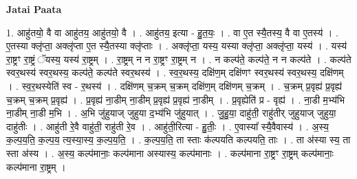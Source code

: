 \documentclass[17pt]{extarticle}
\begin{document}
\textbf{Jatai Paata} \newline

1. आहु॑तयो॒ वै वा आहु॑तय॒ आहु॑तयो॒ वै । . आहु॑तय॒ इत्या - हु॒त॒यः॒ । . वा ए॒त स्यै॒तस्य॒ वै वा ए॒तस्य॑ । . ए॒तस्या क्लृ॑प्ता॒ अक्लृ॑प्ता ए॒त स्यै॒तस्या क्लृ॑प्ताः । . अक्लृ॑प्ता॒ यस्य॒ यस्या क्लृ॑प्ता॒ अक्लृ॑प्ता॒ यस्य॑ । . यस्य॑ रा॒ष्ट्रꣳ रा॒ष्ट्रं ॅयस्य॒ यस्य॑ रा॒ष्ट्रम् । . रा॒ष्ट्रम् न न रा॒ष्ट्रꣳ रा॒ष्ट्रम् न । . न कल्प॑ते॒ कल्प॑ते॒ न न कल्प॑ते । . कल्प॑ते स्वर॒थस्य॑ स्वर॒थस्य॒ कल्प॑ते॒ कल्प॑ते स्वर॒थस्य॑ । . स्व॒र॒थस्य॒ दक्षि॑ण॒म् दक्षि॑णꣳ स्वर॒थस्य॑ स्वर॒थस्य॒ दक्षि॑णम् । . स्व॒र॒थस्येति॑ स्व - र॒थस्य॑ । . दक्षि॑णम् च॒क्रम् च॒क्रम् दक्षि॑ण॒म् दक्षि॑णम् च॒क्रम् । . च॒क्रम् प्र॒वृह्य॑ प्र॒वृह्य॑ च॒क्रम् च॒क्रम् प्र॒वृह्य॑ । . प्र॒वृह्य॑ ना॒डीम् ना॒डीम् प्र॒वृह्य॑ प्र॒वृह्य॑ ना॒डीम् । . प्र॒वृह्येति॑ प्र - वृह्य॑ । . ना॒डी म॒भ्य॑भि ना॒डीम् ना॒डी म॒भि । . अ॒भि जु॑हुयाज् जुहुया द॒भ्य॑भि जु॑हुयात् । . जु॒हु॒या॒ दाहु॑ती॒ राहु॑तीर् जुहुयाज् जुहुया॒ दाहु॑तीः । . आहु॑ती रे॒वै वाहु॑ती॒ राहु॑ती रे॒व । . आहु॑ती॒रित्या - हु॒तीः॒ । . ए॒वास्या᳚ स्यै॒वैवास्य॑ । . अ॒स्य॒ क॒ल्प॒य॒ति॒ क॒ल्प॒य॒ त्य॒स्या॒स्य॒ क॒ल्प॒य॒ति॒ । . क॒ल्प॒य॒ति॒ ता स्ताः क॑ल्पयति कल्पयति॒ ताः । . ता अ॑स्या स्य॒ ता स्ता अ॑स्य । . अ॒स्य॒ कल्प॑मानाः॒ कल्प॑माना अस्यास्य॒ कल्प॑मानाः । . कल्प॑माना रा॒ष्ट्रꣳ रा॒ष्ट्रम् कल्प॑मानाः॒ कल्प॑माना रा॒ष्ट्रम् । \newline
\end{document}
